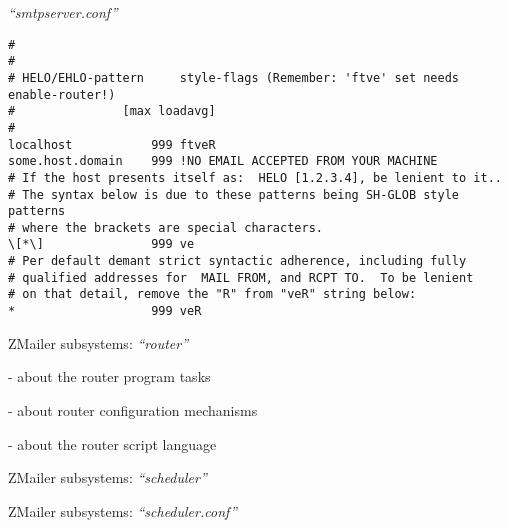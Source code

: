 \documentclass[a4paper,landscape]{slides}
\newcommand{\ZM}{ZMailer}
\begin{document}
\begin{overlay}
\small
\centerline{{\it ``smtpserver.conf''}}
\tiny
\begin{verbatim}
#
#
# HELO/EHLO-pattern     style-flags (Remember: 'ftve' set needs enable-router!)
#               [max loadavg]
#
localhost           999 ftveR
some.host.domain    999 !NO EMAIL ACCEPTED FROM YOUR MACHINE
# If the host presents itself as:  HELO [1.2.3.4], be lenient to it..
# The syntax below is due to these patterns being SH-GLOB style patterns
# where the brackets are special characters.
\[*\]               999 ve
# Per default demant strict syntactic adherence, including fully
# qualified addresses for  MAIL FROM, and RCPT TO.  To be lenient
# on that detail, remove the "R" from "veR" string below:
*                   999 veR

\end{verbatim}

\end{overlay}



\begin{slide}

\centerline{\large \ZM{} subsystems: {\it ``router''}}

- about the router program tasks

- about router configuration mechanisms

- about the router script language


\vfill

\end{slide}



\begin{slide}

\centerline{\large \ZM{} subsystems: {\it ``scheduler''}}

\vfill

\end{slide}


\begin{overlay}

\centerline{\large \ZM{} subsystems: {\it ``scheduler.conf''}}

\vfill

\end{overlay}
\end{document}
